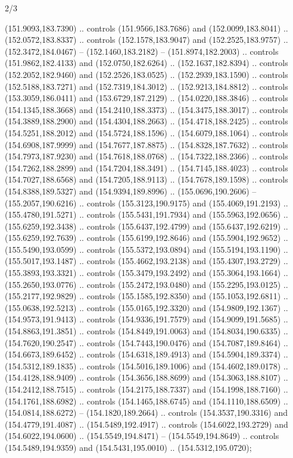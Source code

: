 \begin{flagdescription}{2/3}
\begin{scope}[shift={(0.5\flaglength,0.5)},scale=\flagwidth/320]
\begin{scope}[y=0.8pt, x=0.8pt, yscale=-1,shift={(-118.3,-146)}]
  (151.9093,183.7390) .. controls (151.9566,183.7686) and (152.0099,183.8041) ..
  (152.0572,183.8337) .. controls (152.1578,183.9047) and (152.2525,183.9757) ..
  (152.3472,184.0467) -- (152.1460,183.2182) -- (151.8974,182.2003) .. controls
  (151.9862,182.4133) and (152.0750,182.6264) .. (152.1637,182.8394) .. controls
  (152.2052,182.9460) and (152.2526,183.0525) .. (152.2939,183.1590) .. controls
  (152.5188,183.7271) and (152.7319,184.3012) .. (152.9213,184.8812) .. controls
  (153.3059,186.0411) and (153.6729,187.2129) .. (154.0220,188.3846) .. controls
  (154.1345,188.3668) and (154.2410,188.3373) .. (154.3475,188.3017) .. controls
  (154.3889,188.2900) and (154.4304,188.2663) .. (154.4718,188.2425) .. controls
  (154.5251,188.2012) and (154.5724,188.1596) .. (154.6079,188.1064) .. controls
  (154.6908,187.9999) and (154.7677,187.8875) .. (154.8328,187.7632) .. controls
  (154.7973,187.9230) and (154.7618,188.0768) .. (154.7322,188.2366) .. controls
  (154.7262,188.2899) and (154.7204,188.3491) .. (154.7145,188.4023) .. controls
  (154.7027,188.6568) and (154.7205,188.9113) .. (154.7678,189.1598) .. controls
  (154.8388,189.5327) and (154.9394,189.8996) .. (155.0696,190.2606) --
  (155.2057,190.6216) .. controls (155.3123,190.9175) and (155.4069,191.2193) ..
  (155.4780,191.5271) .. controls (155.5431,191.7934) and (155.5963,192.0656) ..
  (155.6259,192.3438) .. controls (155.6437,192.4799) and (155.6437,192.6219) ..
  (155.6259,192.7639) .. controls (155.6199,192.8646) and (155.5904,192.9652) ..
  (155.5490,193.0599) .. controls (155.5372,193.0894) and (155.5194,193.1190) ..
  (155.5017,193.1487) .. controls (155.4662,193.2138) and (155.4307,193.2729) ..
  (155.3893,193.3321) .. controls (155.3479,193.2492) and (155.3064,193.1664) ..
  (155.2650,193.0776) .. controls (155.2472,193.0480) and (155.2295,193.0125) ..
  (155.2177,192.9829) .. controls (155.1585,192.8350) and (155.1053,192.6811) ..
  (155.0638,192.5213) .. controls (155.0165,192.3320) and (154.9809,192.1367) ..
  (154.9573,191.9413) .. controls (154.9336,191.7579) and (154.9099,191.5685) ..
  (154.8863,191.3851) .. controls (154.8449,191.0063) and (154.8034,190.6335) ..
  (154.7620,190.2547) .. controls (154.7443,190.0476) and (154.7087,189.8464) ..
  (154.6673,189.6452) .. controls (154.6318,189.4913) and (154.5904,189.3374) ..
  (154.5312,189.1835) .. controls (154.5016,189.1006) and (154.4602,189.0178) ..
  (154.4128,188.9409) .. controls (154.3656,188.8699) and (154.3063,188.8107) ..
  (154.2412,188.7515) .. controls (154.2175,188.7337) and (154.1998,188.7160) ..
  (154.1761,188.6982) .. controls (154.1465,188.6745) and (154.1110,188.6509) ..
  (154.0814,188.6272) -- (154.1820,189.2664) .. controls (154.3537,190.3316) and
  (154.4779,191.4087) .. (154.5489,192.4917) .. controls (154.6022,193.2729) and
  (154.6022,194.0600) .. (154.5549,194.8471) -- (154.5549,194.8649) .. controls
  (154.5489,194.9359) and (154.5431,195.0010) .. (154.5312,195.0720);


\end{scope}
\end{scope}
\end{flagdescription}
